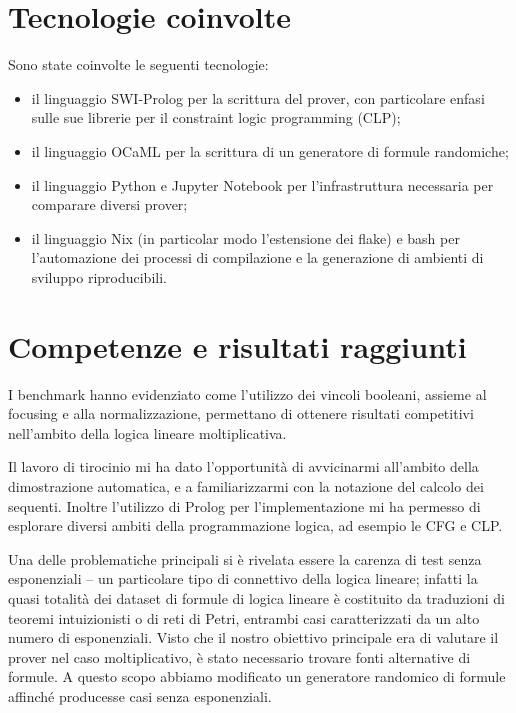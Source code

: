\documentclass[a4paper, 12pt, italian]{article}
\begin{document}
\section{Tecnologie coinvolte}
Sono state coinvolte le seguenti tecnologie:
\begin{itemize}
	\item il linguaggio SWI-Prolog per la scrittura del prover, con particolare enfasi sulle sue librerie per il constraint logic programming (CLP);
	\item il linguaggio OCaML per la scrittura di un generatore di formule randomiche;
	\item il linguaggio Python e Jupyter Notebook per l'infrastruttura necessaria per comparare diversi prover;
	\item il linguaggio Nix (in particolar modo l'estensione dei flake) e bash per l'automazione dei processi di compilazione e la generazione di ambienti di sviluppo riproducibili.
\end{itemize}

\section{Competenze e risultati raggiunti}
I benchmark hanno evidenziato come l'utilizzo dei vincoli booleani, assieme al focusing e alla normalizzazione, permettano di ottenere risultati competitivi nell’ambito della logica lineare moltiplicativa.

Il lavoro di tirocinio mi ha dato l'opportunità di avvicinarmi all’ambito della dimostrazione automatica, e a familiarizzarmi con la notazione del calcolo dei sequenti.
Inoltre l’utilizzo di Prolog per l'implementazione mi ha permesso di esplorare diversi ambiti della programmazione logica, ad esempio le CFG e CLP.

Una delle problematiche principali si è rivelata essere la carenza di test senza esponenziali -- un particolare tipo di connettivo della logica lineare; infatti la quasi totalità dei dataset di formule di logica lineare è costituito da traduzioni di teoremi intuizionisti o di reti di Petri, entrambi casi caratterizzati da un alto numero di esponenziali.
Visto che il nostro obiettivo principale era di valutare il prover nel caso moltiplicativo, è stato necessario trovare fonti alternative di formule.
A questo scopo abbiamo modificato un generatore randomico di formule affinché producesse casi senza esponenziali.

\newpage


\end{document}
